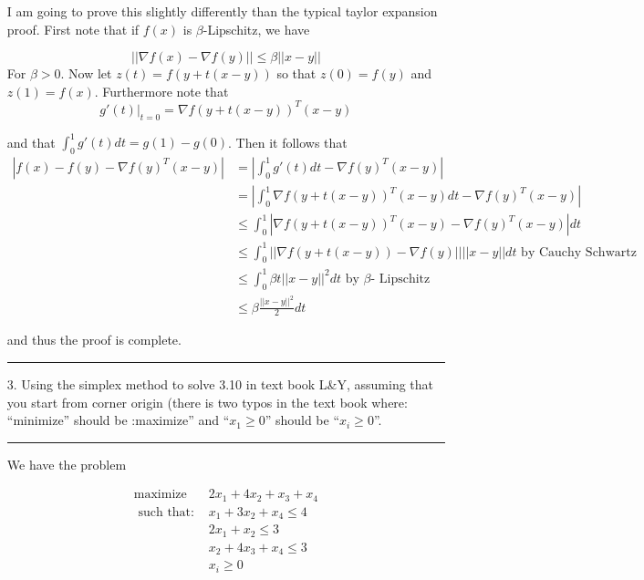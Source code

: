 \documentclass{article} %
\begin{document}
\begin{enumerate}
I am going to prove this slightly differently than the typical taylor expansion proof. First note that if $f(x)$ is $\beta$-Lipschitz, we have


\[
|| \nabla f(x) - \nabla f(y) || \leq \beta ||x - y ||
\]
For $\beta > 0$. Now let $z(t) = f(y + t(x -y))$ so that $z(0) = f(y)$ and $z(1) = f(x)$. Furthermore note that
\[
g'(t)|_{t = 0 } = \nabla f(y + t(x - y))^{T} (x - y)
\]

and that $\int_{0}^{1} g'(t) dt = g(1) - g(0)$. Then it follows that 
\begin{equation*}
\begin{aligned}
|f(x) - f(y) - \nabla f(y)^T (x - y) | &= | \int_{0}^{1} g'(t) dt - \nabla f(y)^T (x -y)|   \\ 
&= | \int_{0}^{1} \nabla f(y + t(x - y))^T (x - y) dt - \nabla f(y)^T (x - y) | \\ 
&\leq \int_{0}^1 | \nabla f(y + t(x - y))^T (x - y) - \nabla f(y)^T (x - y) |dt  \\ 
&\leq \int_{0}^1 || \nabla f(y + t(x - y)) - \nabla f(y) || ||x - y|| dt   \mbox{    by Cauchy Schwartz } \\ 
&\leq \int_{0}^1 \beta t ||x - y||^2 dt   \mbox{    by $\beta$- Lipschitz } \\ 
&\leq  \beta  \frac{||x - y||^2}{2} dt  
\end{aligned}
\end{equation*}

and thus the proof is complete. 

\rule{\textwidth}{1pt}
\item[3.] Using the simplex method to solve 3.10 in text book L\&Y, assuming that you start from corner origin (there is two typos in
the text book where: ``minimize'' should be :maximize'' and ``$x_1\ge 0$'' should be ``$x_i\ge 0$''.


\rule{\textwidth}{1pt}


We have the problem 

\begin{equation*}
\begin{aligned}
\mbox{maximize } &2x_1 + 4x_2+ x_3 + x_4 \\ 
\mbox{ such that: } & x_1 + 3x_2 + x_4 \leq 4 \\ 
& 2x_1 + x_2 \leq 3 \\ 
& x_2 + 4x_3 + x_4 \leq 3 \\ 
& x_i \geq 0 
\end{aligned}
\end{equation*}


\end{enumerate}
\end{document}
